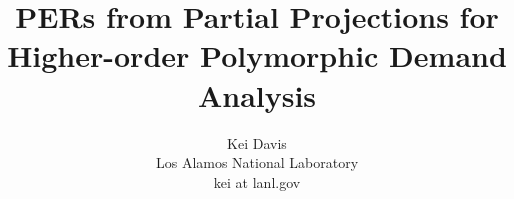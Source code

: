 \documentclass[11pt]{article}
\begin{document}
\title{PERs from Partial Projections for Higher-order Polymorphic Demand Analysis}
\author{Kei Davis\\
  Los Alamos National Laboratory\\
  kei at lanl.gov}
\maketitle

\setcounter{page}{1} %

\newcommand{\com}{\newcommand}
\com{\rcom}{\renewcommand}

\rcom{\ddagger}{*}

\com{\fig}[4]{
\begin{figure}[#1]
\begin{center}
\begin{minipage}{\columnwidth}
\rule[1ex]{\textwidth}{1pt}
#4
\vspace{-1em}
\caption{#2 \label{#3}}
\rule[1ex]{\textwidth}{1pt}
\end{minipage}
\end{center}
\vspace{-3ex}
\end{figure}
}

\com{\progsize}{}                       %
\com{\subtypesize}{\footnotesize}       %
\com{\subsubtypesize}{\scriptsize}      %
\com{\subtypesubstyle}{\scriptstyle}    %
\com{\subtypespace}{\hspace{0.0pt}}     %


\com{\espace}{\vspace{6pt}}
\com{\itt}[1]{\mbox{\it #1}}

\com{\OUTC}{\itt{OUTC}}
\com{\SEL}{\itt{SEL}}
\com{\SPINE}{\itt{SPINE}}
\com{\LBR}{\itt{LBR}}


\com{\newenv}{\newenvironment}
\com{\subsubsect}[1]{\paragraph{{#1}}}
\end{document}
